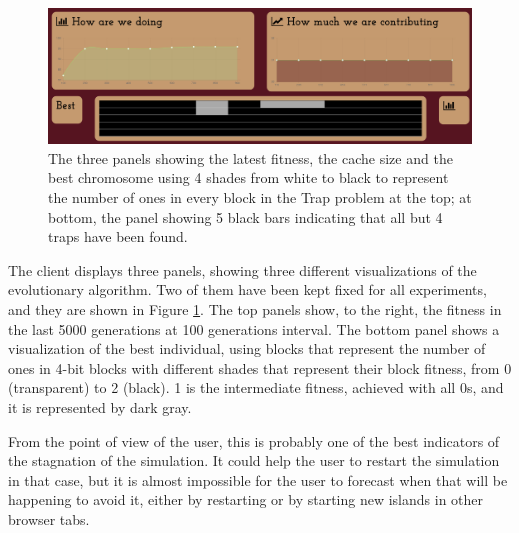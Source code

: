 \documentclass{sig-alternate}
\begin{document}
%
%
 
\begin{figure}[!htb]
\centering
\includegraphics[width=0.9\linewidth]{all.png}
\caption{The three panels showing the latest fitness, the cache size
  and the best chromosome using 4 shades from white to black to
  represent the number of ones in every block in the Trap
  problem at the top; at bottom, the panel showing 5
  black bars indicating that all but 4  traps have been found. \label{fig:all}}
\end{figure}
%
The client displays three panels, showing three different
visualizations of the evolutionary algorithm. Two of them have been
kept fixed for all experiments, and they are shown in Figure
\ref{fig:all}. The top panels show, to the right, the fitness in the
last 5000 generations at 100 generations interval. The bottom panel
shows a visualization of the best individual, using blocks that
represent the number of ones in 4-bit blocks with different shades 
that represent their block fitness, from 0 (transparent) to 2
(black). 1 is the intermediate fitness, achieved with all 0s, and it
is represented by dark gray. 

From the point of view of the user, this is probably one of the best
indicators of the stagnation of the simulation. %
It could help the user to restart the simulation
in that case, but it is almost impossible for the user to forecast
when that will be happening to avoid it, either by restarting or by
starting new islands in other browser tabs. 
\end{document}
